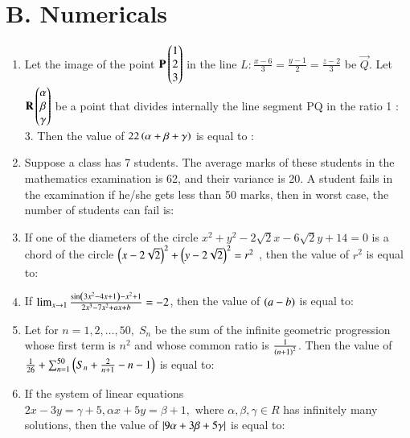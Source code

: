 \documentclass[journal]{IEEEtran}
\theoremstyle{remark}
\begin{document}
\section*{B. Numericals}
\begin{enumerate}

\item  Let the image of the point $\mathbf{P}\begin{pmatrix}1\\ 2\\ 3\end{pmatrix}$ in the line $L: \frac{x - 6}{3} = \frac{y - 1}{2} = \frac{z - 2}{3}$ be $\vec{Q}$. Let $\mathbf{R} \begin{pmatrix}\alpha \\ \beta \\ \gamma\end{pmatrix}$ be a point that divides internally the line segment PQ in the ratio 1 : 3. Then the value of $22\left(\alpha + \beta + \gamma\right)$ is equal to :\\


\item Suppose a class has 7 students. The average marks of these students in the mathematics examination is 62, and their variance is 20. A student fails in the examination if he/she gets less than 50 marks, then in worst case, the number of students can fail is:\\


\item If one of the diameters of the circle $x^2 + y^2 - 2\sqrt{2}x - 6\sqrt{2}y + 14 = 0$ is a chord of the circle
${\left( x - 2\sqrt{2} \right)}^2 + {\left( y - 2\sqrt{2} \right)}^2 = r^2$ , then the value of $r^2$ is equal to:\\

\item If $\lim_{x \to 1} \frac{\sin\left(3x^2 - 4x + 1\right) - x^2 + 1}{2x^3 - 7x^2 + ax + b} = -2$, then the value of $\left(a - b\right)$ is equal to:\\

\item Let for $n = 1, 2,\dots, 50, \; S_n$ be the sum of the infinite geometric progression whose first term is $n^2$ and whose common ratio is $\frac{1}{\left(n + 1\right)^2}$. Then the value of $\frac{1}{26} + \sum_{n=1}^{50} \left( S_n + \frac{2}{n + 1} - n - 1\right) $ is equal to:\\


\item If the system of linear equations $2x - 3y = \gamma + 5, \alpha x + 5y = \beta + 1, \text{ where } \alpha, \beta, \gamma \in R$ has infinitely many solutions, then the value of $\left\vert9\alpha + 3\beta + 5\gamma\right\vert$ is equal to:\\


\end{enumerate}
\end{document}
